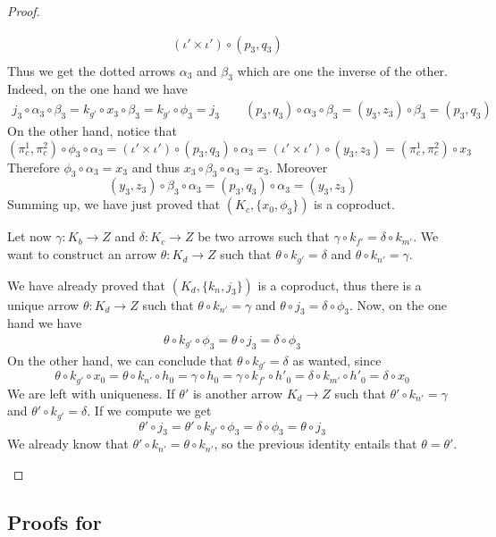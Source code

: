 \documentclass[a4paper,UKenglish,cleveref,pdftex,amsthm,thm-restate,numberwithinsect]{cas-sc}
\theoremstyle{plain}
\theoremstyle{definition}
\begin{document}
\begin{proof}
\begin{enumerate}
\[\begin{split}
(\iota'\times \iota')\circ (p_3, q_3)\\& \end{split}\] 
Thus we get the dotted arrows $\alpha_3$ and $\beta_3$ which are one the inverse of the other. Indeed, on the one hand we have
\begin{align*}
j_3\circ \alpha_3\circ \beta_3=k_{g'}\circ x_3\circ \beta_3=k_{g'} \circ \phi_3=j_3  \qquad 
(p_3, q_3)\circ \alpha_3\circ \beta_3=(y_3, z_3)\circ \beta_3=(p_3, q_3) 
\end{align*}
 On the other hand, notice that
 \[(\pi^1_c, \pi^2_c)\circ \phi_3\circ \alpha_3 =(\iota'\times \iota')\circ (p_3, q_3)\circ \alpha_3= (\iota'\times \iota')\circ (y_3, z_3)=(\pi^1_c, \pi^2_c)\circ x_3\]
 Therefore $\phi_3\circ \alpha_3=x_3$ and thus $x_3\circ \beta_3\circ \alpha_3=x_3$. Moreover
 \[(y_3, z_3)\circ \beta_3\circ \alpha_3=(p_3, q_3)\circ \alpha_3=(y_3, z_3)\]
 Summing up, we have just proved that $(K_c, \{x_0, \phi_3\})$ is a coproduct.
 
 Let now $\gamma\colon K_b\to Z$ and $\delta\colon K_c\to Z$ be two arrows such that $\gamma\circ k_{f'}=\delta\circ k_{m'}$. We want to construct an arrow $\theta\colon K_d\to Z$ such that $\theta\circ k_{g'}=\delta$ and $\theta\circ k_{n'}=\gamma$.	
 
 We have already proved that $(K_d, \{k_n, j_3\})$ is a coproduct, thus there is a unique arrow $\theta\colon K_d\to Z$ such that  $\theta \circ k_{n'}=\gamma$ and $\theta \circ j_3=\delta \circ \phi_3 $.
 Now, on the one hand we have
 \begin{align*}
 	\theta \circ k_{g'}\circ \phi_3=\theta \circ  j_3=\delta\circ \phi_3 
 \end{align*}
 On the other hand, we can conclude that $\theta \circ k_{g'}=\delta$ as wanted, since
 \[\theta \circ k_{g'}\circ x_0=\theta \circ k_{n'}\circ h_0=\gamma \circ h_0=\gamma \circ k_{f'}\circ h'_0=\delta \circ k_{m'}\circ h'_0=\delta \circ x_0 \]
 We are left with uniqueness. If $\theta'$ is another arrow $K_d\to Z$ such that $\theta'\circ k_{n'}=\gamma$ and $\theta'\circ k_{g'}= \delta$. If we compute we get
 \[\theta'\circ j_3=\theta'\circ k_{g'}\circ \phi_3=\delta \circ \phi_3=\theta \circ j_3 \]
 We already know that $\theta'\circ k_{n'}=\theta \circ k_{n'}$, so the previous identity entails that $\theta =\theta'$.
			 \qedhere 
	\end{enumerate}
\end{proof}

\newpage
\subsection{Proofs for }\label{app:due}
\fhyp*
\end{document}
